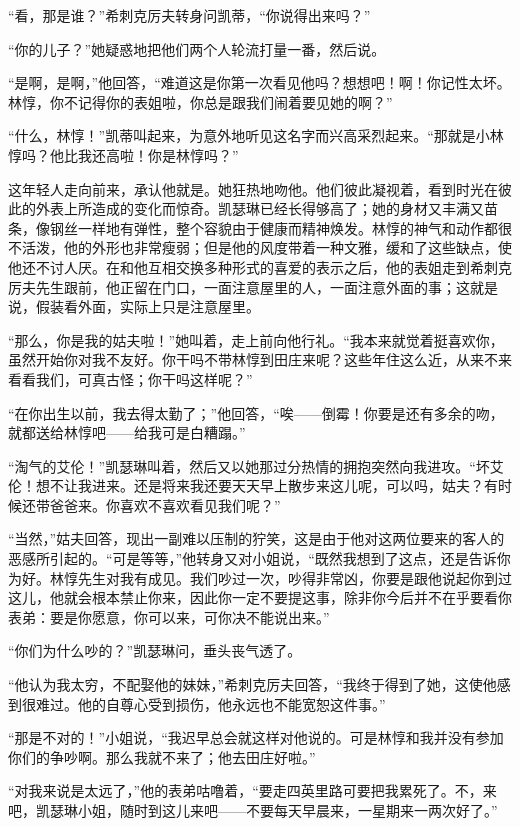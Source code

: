 \par “看，那是谁？”希刺克厉夫转身问凯蒂，“你说得出来吗？”
\par “你的儿子？”她疑惑地把他们两个人轮流打量一番，然后说。
\par “是啊，是啊，”他回答，“难道这是你第一次看见他吗？想想吧！啊！你记性太坏。林惇，你不记得你的表姐啦，你总是跟我们闹着要见她的啊？”
\par “什么，林惇！”凯蒂叫起来，为意外地听见这名字而兴高采烈起来。“那就是小林惇吗？他比我还高啦！你是林惇吗？”
\par 这年轻人走向前来，承认他就是。她狂热地吻他。他们彼此凝视着，看到时光在彼此的外表上所造成的变化而惊奇。凯瑟琳已经长得够高了；她的身材又丰满又苗条，像钢丝一样地有弹性，整个容貌由于健康而精神焕发。林惇的神气和动作都很不活泼，他的外形也非常瘦弱；但是他的风度带着一种文雅，缓和了这些缺点，使他还不讨人厌。在和他互相交换多种形式的喜爱的表示之后，他的表姐走到希刺克厉夫先生跟前，他正留在门口，一面注意屋里的人，一面注意外面的事；这就是说，假装看外面，实际上只是注意屋里。
\par “那么，你是我的姑夫啦！”她叫着，走上前向他行礼。“我本来就觉着挺喜欢你，虽然开始你对我不友好。你干吗不带林惇到田庄来呢？这些年住这么近，从来不来看看我们，可真古怪；你干吗这样呢？”
\par “在你出生以前，我去得太勤了；”他回答，“唉——倒霉！你要是还有多余的吻，就都送给林惇吧——给我可是白糟蹋。”
\par “淘气的艾伦！”凯瑟琳叫着，然后又以她那过分热情的拥抱突然向我进攻。“坏艾伦！想不让我进来。还是将来我还要天天早上散步来这儿呢，可以吗，姑夫？有时候还带爸爸来。你喜欢不喜欢看见我们呢？”
\par “当然，”姑夫回答，现出一副难以压制的狞笑，这是由于他对这两位要来的客人的恶感所引起的。“可是等等，”他转身又对小姐说，“既然我想到了这点，还是告诉你为好。林惇先生对我有成见。我们吵过一次，吵得非常凶，你要是跟他说起你到过这儿，他就会根本禁止你来，因此你一定不要提这事，除非你今后并不在乎要看你表弟：要是你愿意，你可以来，可你决不能说出来。”
\par “你们为什么吵的？”凯瑟琳问，垂头丧气透了。
\par “他认为我太穷，不配娶他的妹妹，”希刺克厉夫回答，“我终于得到了她，这使他感到很难过。他的自尊心受到损伤，他永远也不能宽恕这件事。”
\par “那是不对的！”小姐说，“我迟早总会就这样对他说的。可是林惇和我并没有参加你们的争吵啊。那么我就不来了；他去田庄好啦。”
\par “对我来说是太远了，”他的表弟咕噜着，“要走四英里路可要把我累死了。不，来吧，凯瑟琳小姐，随时到这儿来吧——不要每天早晨来，一星期来一两次好了。”
